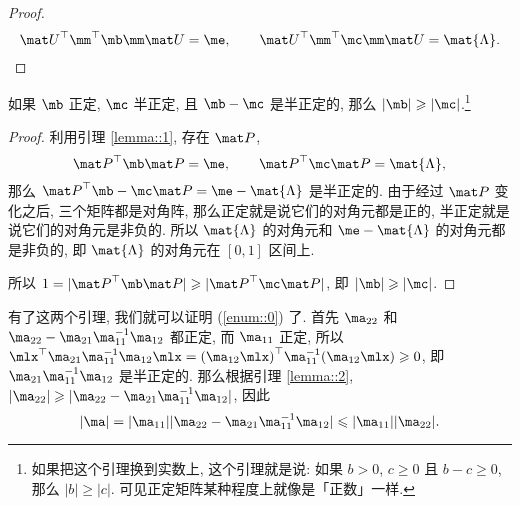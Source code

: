 \begin{solution}
\begin{enumerate}
\begin{proof}
        \[
            \quadform{\muu}{\quadform{\mm}{\mb}} = \me, \qquad \quadform{\muu}{\quadform{\mm}{\mc}} = \mat{\Lambda}.
        \]
    \end{proof}
    \newpage
    \begin{lemma}\label{lemma::2}
        如果 $\mb$ 正定, $\mc$ 半正定, 且 $\mb - \mc$ 是半正定的, 那么 $|\mb| \geqslant |\mc|$.\footnote{如果把这个引理换到实数上, 这个引理就是说: 如果 $b > 0$, $c \geqslant 0$ 且 $b - c \geqslant 0$, 那么 $|b| \geqslant |c|$. 可见正定矩阵某种程度上就像是「正数」一样.}
    \end{lemma}
    \begin{proof}
        利用引理 \ref{lemma::1}, 存在 $\mpp$,
        \[
            \quadform{\mpp}{\mb} = \me, \qquad \quadform{\mpp}{\mc} = \mat{\Lambda},
        \]
        那么 $\quadform{\mpp}{\mb - \mc} = \me - \mat{\Lambda}$ 是半正定的. 由于经过 $\mpp$ 变化之后, 三个矩阵都是对角阵, 那么正定就是说它们的对角元都是正的, 半正定就是说它们的对角元是非负的. 所以 $\mat{\Lambda}$ 的对角元和 $\me - \mat{\Lambda}$ 的对角元都是非负的, 即 $\mat{\Lambda}$ 的对角元在 $[0, 1]$ 区间上.

        所以 $1 = |\quadform{\mpp}{\mb}| \geqslant |\quadform{\mpp}{\mc}|$, 即 $|\mb| \geqslant |\mc|$.
    \end{proof}
    有了这两个引理, 我们就可以证明 (\ref{enum::0}) 了. 首先 $\ma_{22}$ 和 $\ma_{22} - \ma_{21}\ma_{11}^{-1}\ma_{12}$ 都正定, 而 $\ma_{11}$ 正定, 所以 $\mlx^\top \ma_{21}\ma_{11}^{-1}\ma_{12}\mlx = \quadform{(\ma_{12}\mlx)}{\ma_{11}^{-1}} \geqslant 0$, 即 $\ma_{21}\ma_{11}^{-1}\ma_{12}$ 是半正定的. 那么根据引理 \ref{lemma::2}, $|\ma_{22}| \geqslant |\ma_{22} - \ma_{21}\ma_{11}^{-1}\ma_{12}|$, 因此
    \[
    |\ma| = |\ma_{11}||\ma_{22} - \ma_{21}\ma_{11}^{-1}\ma_{12}| \leqslant |\ma_{11}||\ma_{22}|.
    \]
\end{enumerate}
\end{solution}

